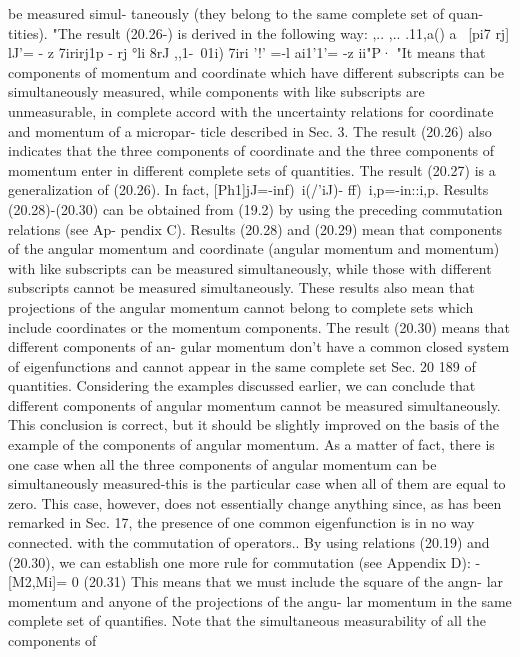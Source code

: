 \documentclass[a4paper,sfsidenotes,colorlinks=true]{tufte-book}
\numberwithin{equation}{section}
\numberwithin{figure}{section}
\begin{document}
{  be measured simul- taneously (they belong to the same complete set
  of quan- tities).  "The result (20.26-) is derived in the following
  way: ,.. ,.. .11,a() a ~[pi7 rj] lJ'= - z 7irirj1p - rj °li 8rJ
  ,,1-\ 01i{) 7iri '!' =-l ai1'1'= -z ii"P· "It means that components
    of momentum and coordinate which have different subscripts can be
    simultaneously measured, while components with like subscripts are
    unmeasurable, in complete accord with the uncertainty relations
    for coordinate and momentum of a micropar- ticle described in
    Sec. 3. The result (20.26) also indicates that the three
    components of coordinate and the three components of momentum
    enter in different complete sets of quantities. The result (20.27)
    is a generalization of (20.26). In fact, [Ph1]jJ=-in{f)~i(/'iJ)-
      ff)~i,p}=-in::i,p.  Results (20.28)-(20.30) can be obtained from
    (19.2) by using the preceding commutation relations (see Ap-
    pendix C). Results (20.28) and (20.29) mean that components of the
    angular momentum and coordinate (angular momentum and momentum)
    with like subscripts can be measured simultaneously, while those
    with different subscripts cannot be measured simultaneously. These
    results also mean that projections of the angular momentum cannot
    belong to complete sets which include coordinates or the momentum
    components. The result (20.30) means that different components of
    an- gular momentum don't have a common closed system of
    eigenfunctions and cannot appear in the same complete set Sec. 20
    189 of quantities. Considering the examples discussed earlier, we
    can conclude that different components of angular momentum cannot
    be measured simultaneously. This conclusion is correct, but it
    should be slightly improved on the basis of the example of the
    components of angular momentum. As a matter of fact, there is one
    case when all the three components of angular momentum can be
    simultaneously measured-this is the particular case when all of
    them are equal to zero. This case, however, does not essentially
    change anything since, as has been remarked in Sec. 17, the
    presence of one common eigenfunction is in no way connected. with
    the commutation of operators.. By using relations (20.19) and
    (20.30), we can establish one more rule for commutation (see
    Appendix D): -[M2,Mi]= 0 (20.31) This means that we must include
    the square of the angn- lar momentum and anyone of the projections
    of the angu- lar momentum in the same complete set of quantifies.
    Note that the simultaneous measurability of all the components of
}}
\end{document}
